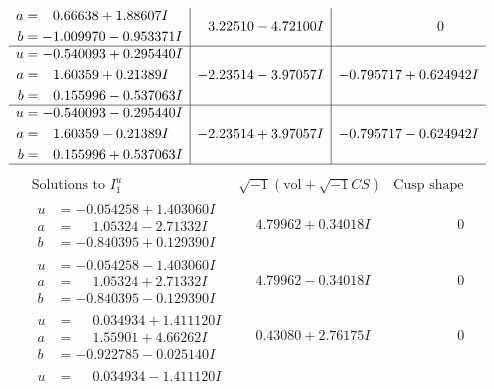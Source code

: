 \documentclass[1p]{elsarticle_modified}
\theoremstyle{definition}
\newcommand{\I}{\sqrt{-1}}
\begin{document}
$$\begin{array}{c|c|c}
\begin{aligned}
a &= \phantom{-}0.66638 + 1.88607 I \\
b &= -1.009970 - 0.953371 I\end{aligned}
 & \phantom{-}3.22510 - 4.72100 I & \phantom{-0.000000 } 0 \\ \hline\begin{aligned}
u &= -0.540093 + 0.295440 I \\
a &= \phantom{-}1.60359 + 0.21389 I \\
b &= \phantom{-}0.155996 - 0.537063 I\end{aligned}
 & -2.23514 - 3.97057 I & -0.795717 + 0.624942 I \\ \hline\begin{aligned}
u &= -0.540093 - 0.295440 I \\
a &= \phantom{-}1.60359 - 0.21389 I \\
b &= \phantom{-}0.155996 + 0.537063 I\end{aligned}
 & -2.23514 + 3.97057 I & -0.795717 - 0.624942 I\\
 \hline 
 \end{array}$$\newpage$$\begin{array}{c|c|c}  
\text{Solutions to }I^u_{1}& \I (\text{vol} + \sqrt{-1}CS) & \text{Cusp shape}\\
 \hline 
\begin{aligned}
u &= -0.054258 + 1.403060 I \\
a &= \phantom{-}1.05324 - 2.71332 I \\
b &= -0.840395 + 0.129390 I\end{aligned}
 & \phantom{-}4.79962 + 0.34018 I & \phantom{-0.000000 } 0 \\ \hline\begin{aligned}
u &= -0.054258 - 1.403060 I \\
a &= \phantom{-}1.05324 + 2.71332 I \\
b &= -0.840395 - 0.129390 I\end{aligned}
 & \phantom{-}4.79962 - 0.34018 I & \phantom{-0.000000 } 0 \\ \hline\begin{aligned}
u &= \phantom{-}0.034934 + 1.411120 I \\
a &= \phantom{-}1.55901 + 4.66262 I \\
b &= -0.922785 - 0.025140 I\end{aligned}
 & \phantom{-}0.43080 + 2.76175 I & \phantom{-0.000000 } 0 \\ \hline\begin{aligned}
u &= \phantom{-}0.034934 - 1.411120 I \\

\end{aligned}
\end{array}$$
\end{document}
